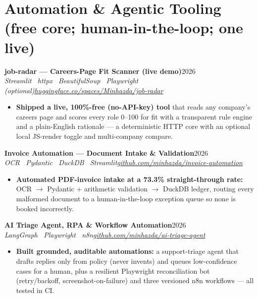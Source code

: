\documentclass[10pt,a4paper]{article}
\newcommand{\entry}[4]{%
  \textbf{#1}\hfill{\color{muted}\small #2}\\[1pt]
  {\color{accent}\itshape #3}\hfill{\color{muted}\itshape\small #4}\par\vspace{2pt}}
\begin{document}
\section{Automation \& Agentic Tooling \textnormal{\small (free core; human-in-the-loop; one live)}}

\entry{job-radar --- Careers-Page Fit Scanner (live demo)}{2026}{Streamlit \textperiodcentered\ httpx \textperiodcentered\ BeautifulSoup \textperiodcentered\ Playwright (optional)}{\href{https://huggingface.co/spaces/Minhazda/job-radar}{huggingface.co/spaces/Minhazda/job-radar}}
\begin{itemize}
  \item \textbf{Shipped a live, 100\%-free (no-API-key) tool} that reads any company's careers page and scores every role 0--100 for fit with a transparent rule engine and a plain-English rationale --- a deterministic HTTP core with an optional local JS-render toggle and multi-company compare.
\end{itemize}

\entry{Invoice Automation --- Document Intake \& Validation}{2026}{OCR \textperiodcentered\ Pydantic \textperiodcentered\ DuckDB \textperiodcentered\ Streamlit}{\href{https://github.com/minhazda/invoice-automation}{github.com/minhazda/invoice-automation}}
\begin{itemize}
  \item \textbf{Automated PDF-invoice intake at a 73.3\% straight-through rate:} OCR $\rightarrow$ Pydantic + arithmetic validation $\rightarrow$ DuckDB ledger, routing every malformed document to a human-in-the-loop exception queue so none is booked incorrectly.
\end{itemize}

\entry{AI Triage Agent, RPA \& Workflow Automation}{2026}{LangGraph \textperiodcentered\ Playwright \textperiodcentered\ n8n}{\href{https://github.com/minhazda/ai-triage-agent}{github.com/minhazda/ai-triage-agent}}
\begin{itemize}
  \item \textbf{Built grounded, auditable automations:} a support-triage agent that drafts replies only from policy (never invents) and queues low-confidence cases for a human, plus a resilient Playwright reconciliation bot (retry/backoff, screenshot-on-failure) and three versioned n8n workflows --- all tested in CI.
\end{itemize}

\end{document}

